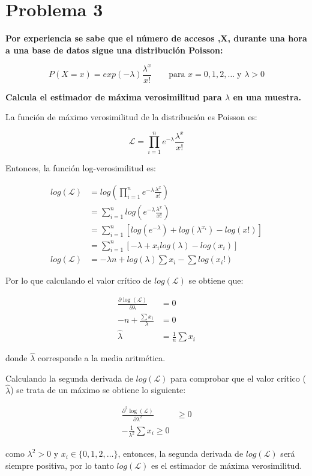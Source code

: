 \section*{Problema 3}

\textbf{Por experiencia se sabe que el número de  accesos ,X, durante una hora a una base de datos sigue una distribución Poisson:}

\begin{equation*}
	P(X=x) = exp(-\lambda) \frac{\lambda^x}{x!} \qquad \text{para } x=0,1,2,\dots \; \text{y } \lambda>0
\end{equation*}

\textbf{Calcula el estimador de máxima verosimilitud para $\lambda$ en una muestra.}

La función de máximo verosimilitud de la distribución es Poisson es:

\begin{equation*}
	\mathcal{L} = \prod_{i=1}^n e^{-\lambda} \frac{\lambda^x}{x!}
\end{equation*}

Entonces, la función log-verosimilitud es:

\begin{align*}
	log(\mathcal{L}) & = log\left (\prod_{i=1}^n e^{-\lambda} \frac{\lambda^x}{x!}\right )            \\
	                 & = \sum_{i=1}^n log \left ( e^{-\lambda} \frac{\lambda^x}{x!}\right )           \\
	                 & = \sum_{i=1}^n \left [ log(e^{-\lambda})+ log(\lambda^{x_i}) -log(x!) \right ] \\
	                 & = \sum_{i=1}^n \left [ -\lambda +x_i log(\lambda) -log(x_i)\right ]            \\
	log(\mathcal{L}) & = -\lambda n + log(\lambda) \sum x_i - \sum log(x_i!)
\end{align*}

Por lo que calculando el valor crítico de $log(\mathcal{L})$ se obtiene que:

\begin{align*}
	\frac{\partial \log(\mathcal{L})}{\partial \lambda} & = 0                    \\
	-n  + \frac{\sum x_i}{\lambda}                      & = 0                    \\
	\hat{\lambda}                                       & = \frac{1}{n} \sum x_i
\end{align*}

donde $\hat{\lambda}$ corresponde a la media aritmética.

Calculando la segunda derivada de $log(\mathcal{L})$ para comprobar que el valor crítico ($\hat{\lambda}$) se trata de un máximo se obtiene lo siguiente:

\begin{align*}
	\frac{\partial^2 \log(\mathcal{L})}{\partial \lambda^2} & \geq 0 \\
	-\frac{1}{\lambda^2} \sum x_i  \geq 0
\end{align*}

como $\lambda^2 > 0$ y $x_i \in \{0,1,2,\dots\}$, entonces, la segunda derivada de $log(\mathcal{L})$ será siempre positiva, por lo tanto $log(\mathcal{L})$ es el estimador de máxima verosimilitud.
